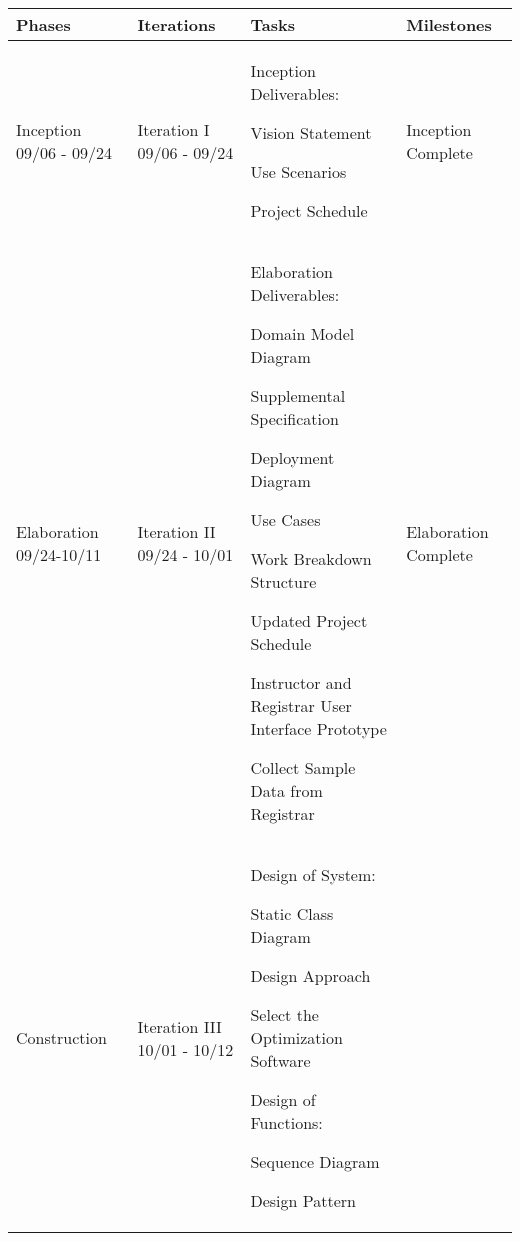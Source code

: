 \documentclass[11pt]{article}
\newenvironment{packed_itemize}{
\begin{itemize}
  \setlength{\itemsep}{1pt}
  \setlength{\parskip}{0pt}
  \setlength{\parsep}{0pt}
}{\end{itemize}}
\begin{document}
\begin{tabular}{|m{0.9in}|m{0.9in}|m{4in}|m{.8in}|}
\hline
\textbf{Phases}  & \textbf{Iterations}  & \textbf{Tasks}        & \textbf{Milestones} \\
\hline\hline
Inception 09/06 - 09/24 &
Iteration I 09/06 - 09/24 & \vspace{0.1in}
Inception Deliverables:
	 \begin{packed_itemize} 
	\vspace{-0.15in}
		\item Vision Statement
		\item Use Scenarios
		\item Project Schedule
	\vspace{-0.15in}
	\end{packed_itemize}
	& Inception Complete\\
\hline
Elaboration 09/24-10/11& 
Iteration II 09/24 - 10/01&  \vspace{0.1in}
Elaboration Deliverables: 
	 \begin{packed_itemize} 
	\vspace{-0.15in}
		\item Domain Model Diagram
		\item Supplemental Specification
		\item Deployment Diagram
		\item Use Cases
		\item Work Breakdown Structure
		\item Updated Project Schedule
   \end{packed_itemize}

\raggedright{
Instructor and Registrar User Interface Prototype
}

Collect Sample Data from Registrar
& Elaboration Complete
\\
\hline

\multirow{10}{*}{Construction }
 &
 Iteration III 10/01 - 10/12 & \vspace{0.1in}
 Design of System:
	\begin{packed_itemize}
		\vspace{-0.15in}
		\item Static Class Diagram
		\item Design Approach
		\item Select the Optimization Software
	\end{packed_itemize}

 Design of Functions:
	\begin{packed_itemize}
		\vspace{-0.15in}
		\item Sequence Diagram
		\item  Design Pattern
	\end{packed_itemize}


\end{tabular}
\end{document}
